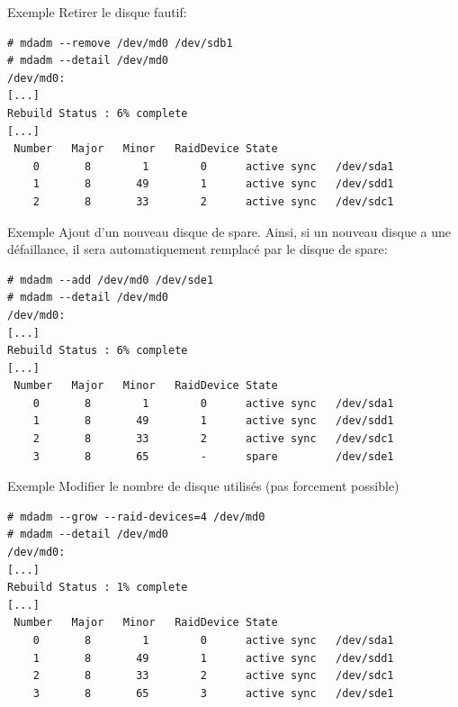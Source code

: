 \begin{frame}[fragile=singleslide]{Exemple}
  Retirer le disque fautif:
  \begin{lstlisting} 
# mdadm --remove /dev/md0 /dev/sdb1
# mdadm --detail /dev/md0
/dev/md0:
[...]
Rebuild Status : 6% complete
[...]
 Number   Major   Minor   RaidDevice State
    0       8        1        0      active sync   /dev/sda1
    1       8       49        1      active sync   /dev/sdd1
    2       8       33        2      active sync   /dev/sdc1
  \end{lstlisting} 
\end{frame}

\begin{frame}[fragile=singleslide]{Exemple}
  Ajout d'un nouveau  disque de spare.  Ainsi, si  un nouveau disque a
  une défaillance,  il sera automatiquement remplacé par  le disque de
  spare:
  \begin{lstlisting} 
# mdadm --add /dev/md0 /dev/sde1
# mdadm --detail /dev/md0
/dev/md0:
[...]
Rebuild Status : 6% complete
[...]
 Number   Major   Minor   RaidDevice State
    0       8        1        0      active sync   /dev/sda1
    1       8       49        1      active sync   /dev/sdd1
    2       8       33        2      active sync   /dev/sdc1
    3       8       65        -      spare         /dev/sde1
  \end{lstlisting}
\end{frame}

\begin{frame}[fragile=singleslide]{Exemple}
  Modifier le nombre de disque utilisés (pas forcement possible)
  \begin{lstlisting} 
# mdadm --grow --raid-devices=4 /dev/md0
# mdadm --detail /dev/md0
/dev/md0:
[...]
Rebuild Status : 1% complete
[...]
 Number   Major   Minor   RaidDevice State
    0       8        1        0      active sync   /dev/sda1
    1       8       49        1      active sync   /dev/sdd1
    2       8       33        2      active sync   /dev/sdc1
    3       8       65        3      active sync   /dev/sde1
  \end{lstlisting}
\end{frame} 
